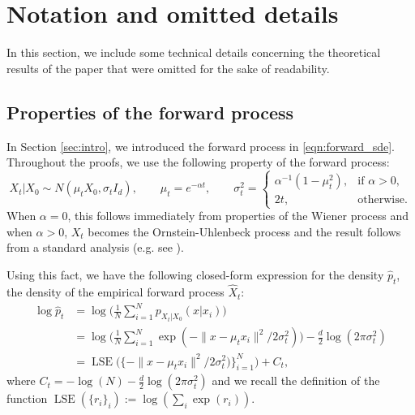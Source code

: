 \documentclass[10pt]{article}
\theoremstyle{plain}
\theoremstyle{definition}
\theoremstyle{remark}
\newcommand{\lse}{\operatorname{LSE}}
\begin{document}




\newpage
\appendix

\section{Notation and omitted details}\label{sec:main_details}
In this section, we include some technical details concerning the theoretical results of the paper that were omitted for the sake of readability.

\subsection{Properties of the forward process}\label{app:diffusion_details}
In Section \ref{sec:intro}, we introduced the forward process in \eqref{eqn:forward_sde}. Throughout the proofs, we use the following property of the forward process:
\begin{equation}
    X_t|X_0 \sim N(\mu_t X_0, \sigma_t I_d), \qquad \mu_t = e^{- \alpha t}, \qquad \sigma^2_t = \begin{cases}
        \alpha^{-1} (1 - \mu_t^2), & \text{if } \alpha > 0,\\
        2t, & \text{otherwise.}
    \end{cases}\label{eq:cond_score_form}
\end{equation}
When \(\alpha = 0\), this follows immediately from properties of the Wiener process and when \(\alpha > 0\), \(X_t\) becomes the Ornstein-Uhlenbeck process and the result follows from a standard analysis (e.g. see \cite{Pavliotis2014-dc}).

Using this fact, we have the following closed-form expression for the density \(\hat{p}_t\), the density of the empirical forward process \(\hat{X}_t\):
\begin{align*}
    \log \hat{p}_t &= \log \bigg ( \frac{1}{N} \sum_{i=1}^N p_{X_t|X_0}(x|x_i) \bigg )\\
    &= \log \bigg ( \frac{1}{N} \sum_{i=1}^N \exp(-\|x - \mu_t x_i\|^2/2\sigma_t^2) \bigg ) - \frac{d}{2} \log(2 \pi \sigma_t^2)\\
    &= \lse \bigg ( \bigg \{ -\|x - \mu_t x_i\|^2/2\sigma_t^2) \bigg \}_{i=1}^N \bigg ) + C_t,
\end{align*}
where \(C_t = - \log(N) - \frac{d}{2} \log(2 \pi \sigma_t^2)\) and we recall the definition of the function \(\lse(\{r_i\}_i) := \log (\sum_i \exp(r_i))\).
\end{document}

